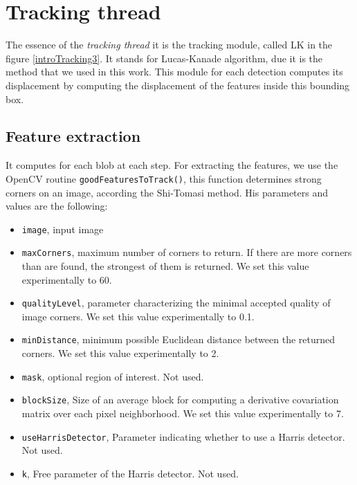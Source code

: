 \section{Tracking thread}




The essence of the \textit{tracking thread} it is the tracking module, called LK in the figure \ref{introTracking3}. It stands for Lucas-Kanade algorithm, due it is the method that we used in this work. This module for each detection computes its displacement by computing the displacement of the features inside this bounding box. 

\subsection{Feature extraction}

It computes for each blob at each step. For extracting the features, we use the OpenCV routine \texttt{goodFeaturesToTrack()}, this function determines strong corners on an image, according the Shi-Tomasi method. His parameters and values are the following:
 
\begin{itemize}

\item \texttt{image}, input image

\item \texttt{maxCorners}, maximum number of corners to return. If there are more corners than are found, the strongest of them is returned. We set this value experimentally to 60.
\item \texttt{qualityLevel}, parameter characterizing the minimal accepted quality of image corners. We set this value experimentally to 0.1.
\item \texttt{minDistance}, minimum possible Euclidean distance between the returned corners. We set this value experimentally to 2.
\item \texttt{mask}, optional region of interest. Not used.
\item \texttt{blockSize}, Size of an average block for computing a derivative covariation matrix over each pixel neighborhood. We set this value experimentally to 7.
\item \texttt{useHarrisDetector},  Parameter indicating whether to use a Harris detector. Not used.
\item \texttt{k},  Free parameter of the Harris detector. Not used.

\end{itemize}

